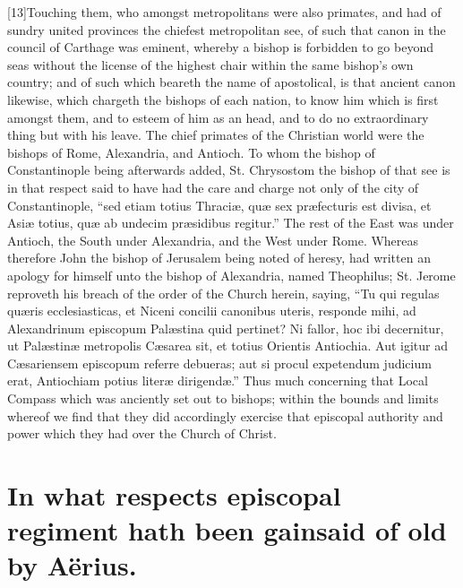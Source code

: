 [13]Touching them, who amongst metropolitans were also primates, and had of sundry united provinces the chiefest metropolitan see, of such that canon in the council of Carthage was eminent, whereby a bishop is forbidden to go beyond seas without the license of the highest chair within the same bishop’s own country; and of such which beareth the name of apostolical, is that ancient canon likewise, which chargeth the bishops of each nation, to know him which is first amongst them, and to esteem of him as an head, and to do no extraordinary thing but with his leave. The chief primates of the Christian world were the bishops of Rome, Alexandria, and Antioch. To whom the bishop of Constantinople being afterwards added, St. Chrysostom the bishop of that see is in  that respect said to have had the care and charge not only of the city of Constantinople,
 “sed etiam totius Thraciæ, quæ sex præfecturis est divisa, et Asiæ totius, quæ ab undecim præsidibus regitur.” The rest of the East was under Antioch, the South under Alexandria, and the West under Rome. Whereas therefore John the bishop of Jerusalem being noted of heresy, had written an apology for himself unto the bishop of Alexandria, named Theophilus; St. Jerome reproveth his breach of the order of the Church herein, saying, “Tu qui regulas quæris ecclesiasticas, et Niceni concilii canonibus uteris, responde mihi, ad Alexandrinum episcopum Palæstina quid pertinet? Ni fallor, hoc ibi decernitur, ut Palæstinæ metropolis Cæsarea sit, et totius Orientis Antiochia. Aut igitur ad Cæsariensem episcopum referre debueras; aut si procul expetendum judicium erat, Antiochiam potius literæ dirigendæ.” Thus much concerning that Local Compass which was anciently set out to bishops; within the bounds and limits whereof we find that they did accordingly exercise that episcopal authority and power which they had over the Church of Christ.

\section*{In what respects episcopal regiment hath been gainsaid of old by Aërius.}

